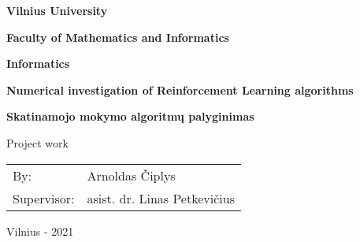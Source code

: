 \begin{titlepage}
\begin{center}
\vspace*{1cm}

\textbf{Vilnius University}

\textbf{Faculty of Mathematics and Informatics}

\textbf{Informatics}

\vfill

\textbf{Numerical investigation of Reinforcement Learning algorithms}

\vspace{0.5cm}

\textbf{Skatinamojo mokymo algoritmų palyginimas}

\vspace{0.5cm}

Project work

\vfill

\begin{tabular}{p{8cm} p{6cm}}
By: & Arnoldas Čiplys\\
Supervisor: & asist. dr. Linas Petkevičius\\
\end{tabular}

\vfill

Vilnius - 2021

\end{center}
\end{titlepage}